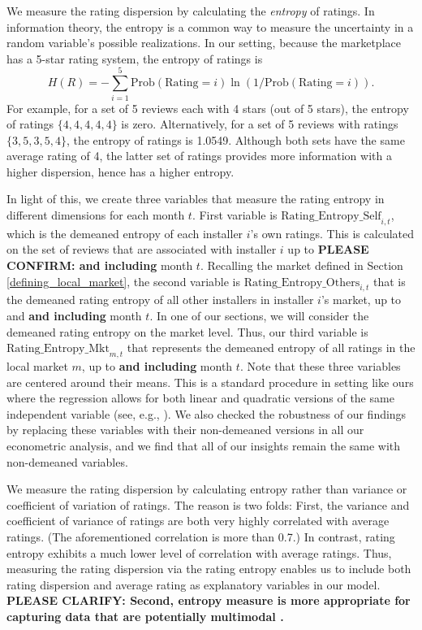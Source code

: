 \documentclass[msom,blindrev]{informs3}
\begin{document}
We measure the rating dispersion by calculating the \emph{entropy} of ratings. In information theory, the entropy is a common way to measure  the uncertainty in a random variable's possible realizations. In our setting, because the marketplace has a 5-star rating system, the entropy of ratings is
\begin{equation}\label{def: entropy}
H(R)=-\sum_{i=1}^{5} \text{Prob}(\text{Rating}=i) \ln(1/\text{Prob}(\text{Rating}=i)).
\end{equation}
For example, for a set of 5 reviews each with 4 stars (out of 5 stars), the entropy of ratings $\{4,4,4,4,4\}$ is zero. Alternatively, for a set of 5 reviews with ratings $\{3,5,3,5,4\}$, the entropy of ratings is 1.0549. Although both sets have the same average rating of 4, the latter set of ratings provides more information with a higher dispersion, hence has a higher entropy.


In light of this, we create three variables that measure the rating entropy in different dimensions for each month $t$. First variable is $\text{Rating\_Entropy\_Self}_{i,t}$, which is the demeaned entropy of each installer $i$'s own ratings. This is calculated on the set of reviews that are associated with installer $i$ up to \textbf{PLEASE CONFIRM: and including} month $t$. Recalling the market defined in Section \ref{defining_local_market}, the second variable is $\text{Rating\_Entropy\_Others}_{i,t}$ that is the demeaned rating entropy of all other installers in installer $i$'s market, up to and \textbf{and including} month $t$. In one of our sections, we will consider the demeaned rating entropy on the market level. Thus, our third variable is $\text{Rating\_Entropy\_Mkt}_{m,t}$ that represents the demeaned entropy of all ratings in the local market $m$, up to  \textbf{and including} month $t$. Note that these three variables are centered around their means. This is a standard procedure in setting like ours where the regression allows for both linear and quadratic versions of the same independent variable (see, e.g., \citep{tan2014does}). We also checked the robustness of our findings by replacing these variables with their non-demeaned versions in all our econometric analysis, and we find that all of our insights remain the same with non-demeaned variables.

We measure the rating dispersion by calculating entropy rather than variance or coefficient of variation of ratings. The reason is two folds: First, the variance and coefficient of variance of ratings are both very highly correlated with average ratings. (The aforementioned correlation is more than 0.7.) In contrast, rating entropy exhibits a much lower level of correlation with average ratings. Thus, measuring the rating dispersion via the rating entropy enables us to include both rating dispersion and average rating as explanatory variables in our model. \textbf{PLEASE CLARIFY: Second, entropy measure is more appropriate for capturing data that are potentially multimodal \citep{smaldino2013measures}.}  
\end{document}
